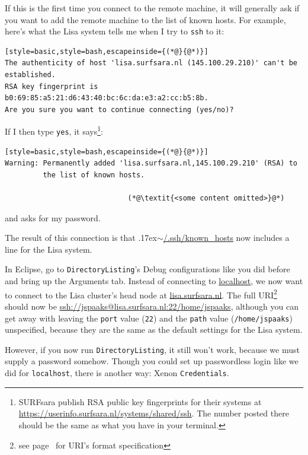 \documentclass[12pt, a4paper, twoside, openany, titlepage]{book}
\newcommand{\mytilde}{\raise.17ex\hbox{$\scriptstyle\sim$}}
\begin{document}
If this is the first time you connect to the remote machine, it will generally ask if you want to add the remote machine to the list of known hosts. For example, here's what the Lisa system tells me when I try to \texttt{ssh} to it:
\begin{lstlisting}[style=basic,style=bash,escapeinside={(*@}{@*)}]
The authenticity of host 'lisa.surfsara.nl (145.100.29.210)' can't be
established.
RSA key fingerprint is b0:69:85:a5:21:d6:43:40:bc:6c:da:e3:a2:cc:b5:8b.
Are you sure you want to continue connecting (yes/no)?
\end{lstlisting}
If I then type \texttt{yes}, it says\footnote{SURFsara publish RSA public key fingerprints for their systems at \url{https://userinfo.surfsara.nl/systems/shared/ssh}. The number posted there should be the same as what you have in your terminal.}:
\begin{lstlisting}[style=basic,style=bash,escapeinside={(*@}{@*)}]
Warning: Permanently added 'lisa.surfsara.nl,145.100.29.210' (RSA) to
         the list of known hosts.

                             (*@\textit{<some content omitted>}@*)
\end{lstlisting}
and asks for my password.

The result of this connection is that \mytilde\url{/.ssh/known_hosts} now includes a line for the Lisa system.


In Eclipse, go to \texttt{DirectoryListing}'s \textsf{Debug configurations} like you did before and bring up the \textsf{Arguments} tab. Instead of connecting to \url{localhost}, we now want to connect to the Lisa cluster's head node at \url{lisa.surfsara.nl}. The full URI\footnote{see page~\pageref{footnote:format-uri} for URI's format specification} should now be \url{ssh://jspaaks@lisa.surfsara.nl:22/home/jspaaks}, although you can get away with leaving the \texttt{port} value (\texttt{22}) and the \texttt{path} value (\texttt{/home/jspaaks}) unspecified, because they are the same as the default settings for the Lisa system.

However, if you now run \texttt{DirectoryListing}, it still won't work, because we must supply a password somehow. Though you could set up passwordless login like we did for \texttt{localhost}, there is another way: Xenon \texttt{Credentials}.
\end{document}
